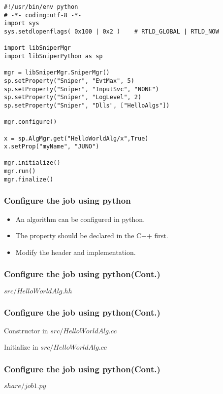 \begin{lrbox}{\createalgproppy}
\begin{lstlisting}[linebackgroundcolor={\ifnum\value{lstnumber}=18\color{green}\fi}]
#!/usr/bin/env python
# -*- coding:utf-8 -*-
import sys
sys.setdlopenflags( 0x100 | 0x2 )    # RTLD_GLOBAL | RTLD_NOW

import libSniperMgr
import libSniperPython as sp

mgr = libSniperMgr.SniperMgr()
sp.setProperty("Sniper", "EvtMax", 5)
sp.setProperty("Sniper", "InputSvc", "NONE")
sp.setProperty("Sniper", "LogLevel", 2)
sp.setProperty("Sniper", "Dlls", ["HelloAlgs"])

mgr.configure()

x = sp.AlgMgr.get("HelloWorldAlg/x",True)
x.setProp("myName", "JUNO")

mgr.initialize()
mgr.run()
mgr.finalize()
\end{lstlisting}
\end{lrbox}


\begin{frame}
    \frametitle{Configure the job using python}
    \begin{itemize}
        \item An algorithm can be configured in python.
        \item The property should be declared in the C++ first.
        \item Modify the header and implementation.
    \end{itemize}
\end{frame}

\begin{frame}
    \frametitle{Configure the job using python(Cont.)}
    \begin{block}{\(src/HelloWorldAlg.hh\)}
        \par\usebox{\createalgpropheader}
    \end{block}
\end{frame}
\begin{frame}
    \frametitle{Configure the job using python(Cont.)}
    \begin{block}{Constructor in \(src/HelloWorldAlg.cc\)}
        \par\usebox{\createalgpropsrcctor}
    \end{block}
    \begin{block}{Initialize in \(src/HelloWorldAlg.cc\)}
        \par\usebox{\createalgpropsrcexecute}
    \end{block}
\end{frame}
\begin{frame}
    \frametitle{Configure the job using python(Cont.)}
    \begin{block}{\(share/job1.py\)}
        \par\usebox{\createalgproppy}
    \end{block}
\end{frame}
